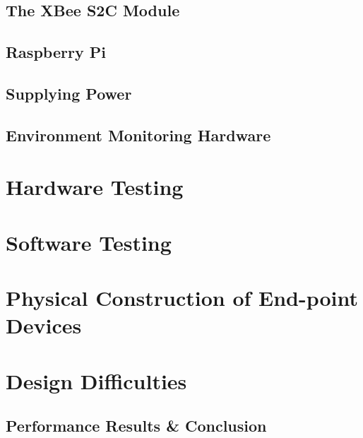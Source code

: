 \documentclass[letter,twocolumn]{report}
\begin{document}
	\twocolumn
	
	\subsection{The XBee S2C Module}
		
		
	\subsection{Raspberry Pi}
		
		
	\subsection{Supplying Power}
		

	\subsection{Environment Monitoring Hardware}
		
	
	\section{Hardware Testing}
		

	\section{Software Testing}
		
	
	\section{Physical Construction of End-point Devices}
		
		
	\section{Design Difficulties}
		
		
	\subsection{Performance Results \& Conclusion}
		
	
	\onecolumn
	
\end{document}
